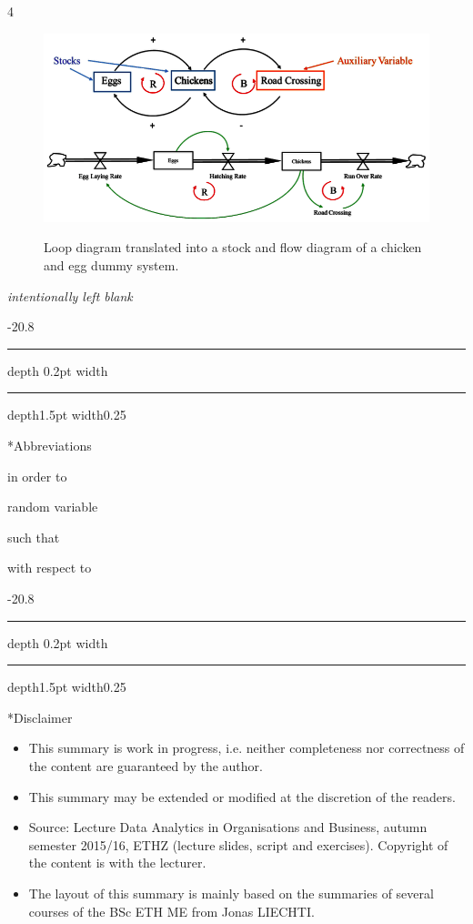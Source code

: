 \documentclass[a4paper, landscape, 6pt, fleqn]{scrartcl}
\makeatletter
\renewcommand{\section}{\@startsection{section}{1}{0mm}%
{-2\baselineskip}{0.8\baselineskip}%
{\hrule depth 0.2pt width\columnwidth\hrule depth1.5pt
width0.25\columnwidth\vspace*{1.2em}\Large\bfseries}}
\makeatother
\begin{document}
\begin{multicols*}{4}
\begin{figure}[H]
\centering
\includegraphics[width=1.05 \linewidth]{StockFlowDiagram}
\label{fig:StockFlowDiagram}
\caption{Loop diagram translated into a stock and flow diagram of a chicken and egg dummy system.}
\end{figure}

\columnbreak
\begin{center}
\textit{intentionally left blank}
\end{center}
\vfill

\section*{Abbreviations}

\begin{description}[style=multiline,leftmargin=1cm,font=\textbf]
\item[IOT] in order to
\item[RV] random variable
\item[s.t.] such that
\item[w.r.t.] with respect to
\end{description}

\section*{Disclaimer}

\begin{itemize}
\item This summary is work in progress, i.e. neither completeness nor correctness of the content are guaranteed by the author.
\item This summary may be extended or modified at the discretion of the readers.
\item Source: Lecture Data Analytics in Organisations and Business, autumn semester 2015/16, ETHZ (lecture slides, script and exercises). Copyright of the content is with the lecturer.
\item The layout of this summary is mainly based on the summaries of several courses of the BSc ETH ME from Jonas LIECHTI.
\end{itemize}

\end{multicols*}
\end{document}
